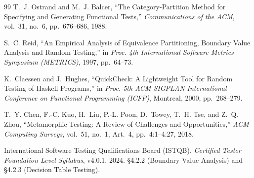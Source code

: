 \documentclass[11pt,a4paper]{article}
\begin{document}
\begin{thebibliography}{99}
T.~J. Ostrand and M.~J. Balcer,
``The Category-Partition Method for Specifying and Generating Functional
Tests,''
\emph{Communications of the ACM}, vol.~31, no.~6, pp.~676--686, 1988.

S.~C. Reid,
``An Empirical Analysis of Equivalence Partitioning, Boundary Value
Analysis and Random Testing,''
in \emph{Proc. 4th International Software Metrics Symposium (METRICS)},
1997, pp.~64--73.

K.~Claessen and J.~Hughes,
``QuickCheck: A Lightweight Tool for Random Testing of Haskell Programs,''
in \emph{Proc. 5th ACM SIGPLAN International Conference on Functional
Programming (ICFP)}, Montreal, 2000, pp.~268--279.

T.~Y. Chen, F.-C. Kuo, H.~Liu, P.-L. Poon, D.~Towey, T.~H. Tse, and
Z.~Q. Zhou,
``Metamorphic Testing: A Review of Challenges and Opportunities,''
\emph{ACM Computing Surveys}, vol.~51, no.~1, Art.~4, pp.~4:1--4:27, 2018.

International Software Testing Qualifications Board (ISTQB),
\emph{Certified Tester Foundation Level Syllabus}, v4.0.1, 2024.
\S4.2.2 (Boundary Value Analysis) and \S4.2.3 (Decision Table Testing).

\end{thebibliography}
\end{document}
